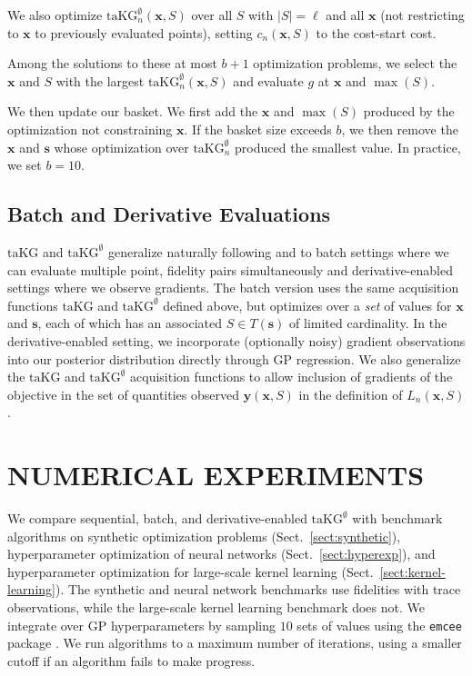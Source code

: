 \documentclass[letterpaper]{article}
\newcommand{\cost}{c}
\newcommand{\x}{\mathbf{x}}
\newcommand{\s}{\mathbf{s}}
\newcommand{\Y}{\mathbf{y}}
\newcommand{\T}{T}
\renewcommand{\S}{S}
\newcommand{\taKG}{\text{taKG}}
\newcommand{\taKGE}{\text{taKG}^\emptyset}
\numberwithin{equation}{section}
\newcommand{\sect}[1]{\ref{sect:#1}}
\begin{document}

We also optimize $\taKGE_n(\x,\S)$ over all $\S$ with $|\S|=\ell$ and all $\x$ 
(not restricting to $\x$ to previously evaluated points),
setting $\cost_n(\x,\S)$ to the cost-start cost.

Among the solutions to these at most $b+1$ optimization problems, we select the $\x$ and $\S$ with the largest $\taKGE_n(\x,\S)$ and evaluate $g$ at $\x$ and $\max(\S)$.

We then update our basket.
We first add the $\x$ and $\max(\S)$ produced by the optimization not constraining $\x$.
If the basket size exceeds $b$, we then remove the $\x$ and $\s$ whose optimization over $\taKGE_n$ produced the smallest value.
In practice, we set $b=10$.

\subsection{Batch and Derivative Evaluations}
\label{sect:extensions}
$\taKG$ and $\taKGE$ generalize naturally 
following \citet{wu2016parallel} and \citet{wu2017bayesian}
to batch settings where we can evaluate multiple point, fidelity pairs simultaneously and derivative-enabled settings where we observe gradients. 
%
The batch version uses the same acquisition functions $\taKG$ and $\taKGE$ defined above, but optimizes over a {\it set} of values for $\x$ and $\s$, each of which has an associated $\S \in \T(\s)$ of limited cardinality.
%
In the derivative-enabled setting, we incorporate (optionally noisy) gradient observations into our posterior distribution directly through GP regression.  We also generalize the $\taKG$ and $\taKGE$ acquisition functions to allow inclusion of gradients of the objective in the set of quantities observed $\Y(\x,\S)$ in the definition of $L_n(\x,\S)$.


\section{NUMERICAL EXPERIMENTS}
\label{sect:numerical}
We compare sequential, batch, and derivative-enabled $\taKGE$ with benchmark algorithms on synthetic optimization problems (Sect.~\sect{synthetic}), hyperparameter optimization of neural networks (Sect.~\sect{hyperexp}), and hyperparameter optimization for large-scale kernel learning (Sect.~\sect{kernel-learning}).  The synthetic and neural network benchmarks use fidelities with trace observations, while the large-scale kernel learning benchmark does not.  We integrate over GP hyperparameters by sampling $10$ sets of values using the \texttt{emcee} package \citep{foreman2013emcee}.
We run algorithms to a maximum number of iterations, using a smaller cutoff if an algorithm fails to make progress.
\end{document}
